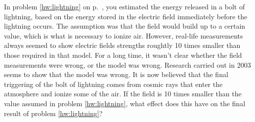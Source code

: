 In problem \ref{hw:lightning} on p.~\pageref{hw:lightning}, you estimated the energy released in a
bolt of lightning, based on the energy stored in the
electric field immediately before the lightning occurs. The
assumption was that the field would build up to a certain
value, which is what is necessary to ionize air. However,
real-life measurements always seemed to show electric fields
strengths roughtly 10 times smaller than those required in
that model. For a long time, it wasn't clear whether the
field measurements were wrong, or the model was wrong.
Research carried out in 2003 seems to show that the model
was wrong. It is now believed that the final triggering of
the bolt of lightning comes from cosmic rays that enter the
atmosphere and ionize some of the air. If the field is 10
times smaller than the value assumed in problem \ref{hw:lightning}, what
effect does this have on the final result of problem \ref{hw:lightning}?\answercheck\hwendpart
